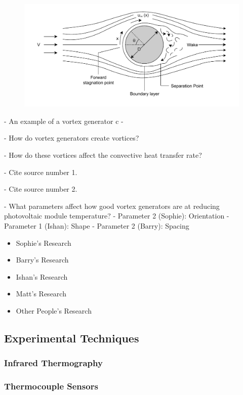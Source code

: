 \begin{figure}[H]
    \centering
    \includegraphics[width=1\linewidth]{Figures/vortex_generator.pdf}
    \caption{}
    \label{fig:vortex_generator}
\end{figure}

- An example of a vortex generator c
- 

- How do vortex generators create vortices?\par
- How do these vortices affect the convective heat transfer rate?\par
- Cite source number 1.\par
- Cite source number 2.\par
\vspace{0.5em}

- What parameters affect how good vortex generators are at reducing photovoltaic module temperature?
- Parameter 2 (Sophie): Orientation
- Parameter 1 (Ishan): Shape
- Parameter 2 (Barry): Spacing

\begin{itemize}
    \item Sophie's Research
    \item Barry's Research
    \item Ishan's Research
    \item Matt's Research
    \item Other People's Research
\end{itemize}

\pagebreak
\subsection{Experimental Techniques}
\subsubsection{Infrared Thermography}
\subsubsection{Thermocouple Sensors}
